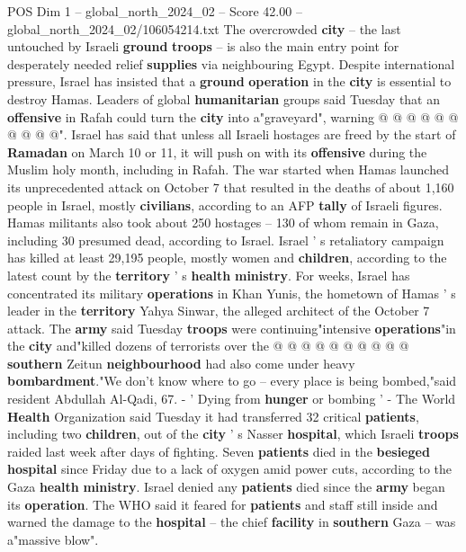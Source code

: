 \begin{textsample}{POS Dim 1 – global\_north\_2024\_02 – Score 42.00 – global\_north\_2024\_02/106054214.txt}
The overcrowded \textbf{city} -- the last untouched by Israeli \textbf{ground} \textbf{troops} -- is also the main entry point for desperately needed relief \textbf{supplies} via neighbouring Egypt.
Despite international pressure, Israel has insisted that a \textbf{ground} \textbf{operation} in the \textbf{city} is essential to destroy Hamas.
Leaders of global \textbf{humanitarian} groups said Tuesday that an \textbf{offensive} in Rafah could turn the \textbf{city} into a"graveyard", warning @ @ @ @ @ @ @ @ @ @".
Israel has said that unless all Israeli hostages are freed by the start of \textbf{Ramadan} on March 10 or 11, it will push on with its \textbf{offensive} during the Muslim holy month, including in Rafah.
The war started when Hamas launched its unprecedented attack on October 7 that resulted in the deaths of about 1,160 people in Israel, mostly \textbf{civilians}, according to an AFP \textbf{tally} of Israeli figures.
Hamas militants also took about 250 hostages -- 130 of whom remain in Gaza, including 30 presumed dead, according to Israel.
Israel ' s retaliatory campaign has killed at least 29,195 people, mostly women and \textbf{children}, according to the latest count by the \textbf{territory} ' s \textbf{health} \textbf{ministry}.
For weeks, Israel has concentrated its military \textbf{operations} in Khan Yunis, the hometown of Hamas ' s leader in the \textbf{territory} Yahya Sinwar, the alleged architect of the October 7 attack.
The \textbf{army} said Tuesday \textbf{troops} were continuing"intensive \textbf{operations}"in the \textbf{city} and"killed dozens of terrorists over the @ @ @ @ @ @ @ @ @ @ \textbf{southern} Zeitun \textbf{neighbourhood} had also come under heavy \textbf{bombardment}."We don't know where to go -- every place is being bombed,"said resident Abdullah Al-Qadi, 67. - ' Dying from \textbf{hunger} or bombing ' - The World \textbf{Health} Organization said Tuesday it had transferred 32 critical \textbf{patients}, including two \textbf{children}, out of the \textbf{city} ' s Nasser \textbf{hospital}, which Israeli \textbf{troops} raided last week after days of fighting.
Seven \textbf{patients} died in the \textbf{besieged} \textbf{hospital} since Friday due to a lack of oxygen amid power cuts, according to the Gaza \textbf{health} \textbf{ministry}.
Israel denied any \textbf{patients} died since the \textbf{army} began its \textbf{operation}.
The WHO said it feared for \textbf{patients} and staff still inside and warned the damage to the \textbf{hospital} -- the chief \textbf{facility} in \textbf{southern} Gaza -- was a"massive blow".

\end{textsample}
